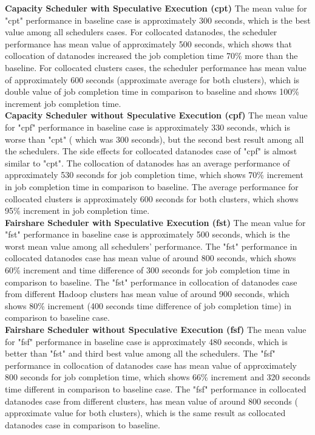 \textbf{Capacity Scheduler with Speculative Execution (cpt)} The mean value for "cpt" performance in baseline case is approximately 300 seconds, which is the best value among all schedulers cases. For collocated datanodes, the scheduler performance has mean value of approximately 500 seconds, which shows that collocation of datanodes increased the job completion time 70\% more than the baseline. For collocated clusters cases, the scheduler performance has mean value of approximately 600 seconds (approximate average for both clusters), which is double value of job completion time in comparison to baseline and shows 100\% increment job completion time.\\

\textbf{Capacity Scheduler without Speculative Execution (cpf)}  The mean value for "cpf" performance  in baseline case is approximately 330 seconds, which is worse than "cpt" ( which was 300 seconds), but the second best result among all the schedulers. The side effects for collocated datanodes case of "cpf" is almost similar to "cpt". The collocation of datanodes has an average performance of approximately 530 seconds for job completion time, which shows 70\% increment in job completion time in comparison to baseline. The average performance for collocated clusters is approximately 600 seconds for both clusters, which shows 95\% increment in job completion time. \\


\textbf{Fairshare Scheduler with Speculative Execution (fst)} The mean value for "fst" performance in  baseline case is approximately 500 seconds, which is the worst mean value among all schedulers' performance. The "fst" performance in collocated datanodes case has mean value of around 800 seconds, which shows 60\% increment and time difference of 300 seconds for job completion time in comparison to baseline. The "fst" performance in collocation of datanodes case from different Hadoop clusters has mean value of around 900 seconds, which shows 80\% increment (400 seconds time difference of job completion time) in comparison to baseline case.\\

\textbf{Fairshare Scheduler without Speculative Execution (fsf) } The  mean value for "fsf" performance  in baseline case is approximately 480 seconds, which is better than "fst" and third best value among all the schedulers. The "fsf" performance in collocation of datanodes case has mean value of approximately 800 seconds for job completion time, which shows 66\% increment and 320 seconds time different in comparison to baseline case. The "fsf" performance in collocated datanodes case from different clusters,  has mean value of around 800 seconds ( approximate value for both clusters), which is the same result as collocated datanodes case in comparison to baseline. \\


